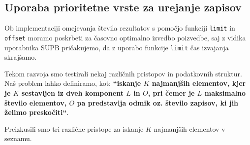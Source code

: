\documentclass[a4paper,12pt,openright]{book}
\begin{document}
        \subsection{Uporaba prioritetne vrste za urejanje zapisov}

        Ob implementaciji omejevanja števila rezultatov s pomočjo funkciji {\tt limit} in {\tt offset} moramo poskrbeti za časovno optimalno izvedbo poizvedbe, saj z vidika uporabnika SUPB pričakujemo, da z uporabo funkcije {\tt limit} čas izvajanja skrajšamo.

        Tekom razvoja smo testirali nekaj različnih pristopov in podatkovnih struktur. Naš problem lahko definiramo, kot: \textbf{``iskanje $K$ najmanjših elementov, kjer je $K$ sestavljen iz dveh komponent $L$ in $O$, pri čemer je $L$ maksimalno število elementov, $O$ pa predstavlja odmik oz. število zapisov, ki jih želimo preskočiti``}.

        Preizkusili smo tri različne pristope za iskanje $K$ najmanjših elementov v seznamu.
\end{document}
